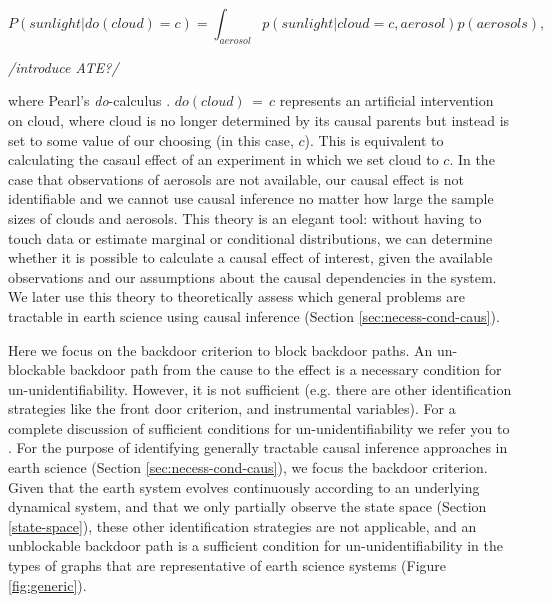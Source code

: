 \documentclass[12pt]{article}
\begin{document}

\begin{equation}
  P(sunlight | do(cloud) = c) = \int_{aerosol} p(sunlight| cloud = c,
  aerosol) p(aerosols),
\end{equation}

\emph{/introduce ATE?/}

where Pearl's \textit{do}-calculus \citep{pearl2009}.
$do(cloud)\, = \,c$ represents an artificial intervention on cloud,
where cloud is no longer determined by its causal parents but instead
is set to some value of our choosing (in this case, $c$). This is
equivalent to calculating the casaul effect of an experiment in which
we set cloud to $c$. In the case that observations of aerosols are not
available, our causal effect is not identifiable and we cannot use
causal inference no matter how large the sample sizes of clouds and
aerosols. This theory is an elegant tool: without having to touch data
or estimate marginal or conditional distributions, we can determine
whether it is possible to calculate a causal effect of interest, given
the available observations and our assumptions about the causal
dependencies in the system. We later use this theory to theoretically
assess which general problems are tractable in earth science using
causal inference (Section \ref{sec:necess-cond-caus}).

Here we focus on the backdoor criterion to block backdoor paths. An
un-blockable backdoor path from the cause to the effect is a necessary
condition for un-unidentifiability. However, it is not sufficient
(e.g. there are other identification strategies like the front door
criterion, and instrumental variables). For a complete discussion of
sufficient conditions for un-unidentifiability we refer you to
\citet{shpitser2006}. For the purpose of identifying generally
tractable causal inference approaches in earth science (Section
\ref{sec:necess-cond-caus}), we focus the backdoor criterion. Given
that the earth system evolves continuously according to an underlying
dynamical system, and that we only partially observe the state space
(Section \ref{state-space}), these other identification strategies are
not applicable, and an unblockable backdoor path is a sufficient
condition for un-unidentifiability in the types of graphs that are
representative of earth science systems (Figure \ref{fig:generic}).
\end{document}
